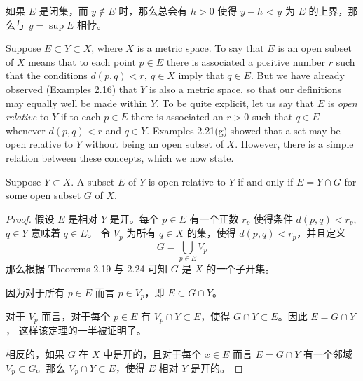 \documentclass[../poma-notes.tex]{subfiles}
\begin{document}
\anote 如果 $E$ 是闭集，而 $y \notin E$ 时，那么总会有 $h>0$ 使得 $y-h$ < $y$ 为 $E$ 的上界，那么与 $y = \sup E$ 相悖。

\begin{remark}
  Suppose $E \subset Y \subset X$, where $X$ is a metric space. To say that $E$ is an open subset of $X$ means that to
  each point $p \in E$ there is associated a positive number $r$ such that the conditions $d(p,q)<r,\ q \in X$ imply
  that $q \in E$. But we have already observed (Examples 2.16) that $Y$ is also a metric space, so that our definitions
  may equally well be made within $Y$. To be quite explicit, let us say that $E$ is \textit{open relative} to $Y$ if to
  each $p \in E$ there is associated an $r>0$ such that $q \in E$ whenever $d(p,q)<r$ and $q \in Y$. Examples 2.21(g)
  showed that a set may be open relative to $Y$ without being an open subset of $X$. However, there is a simple relation
  between these concepts, which we now state.
\end{remark}

\begin{theorem}
  Suppose $Y \subset X$. A subset $E$ of $Y$ is open relative to $Y$ if and only if $E = Y \cap G$ for some open
  subset $G$ of $X$.
\end{theorem}

\begin{proof}
  假设 $E$ 是相对 $Y$ 是开。每个 $p \in E$ 有一个正数 $r_p$ 使得条件 $d(p,q)<r_p$, $q \in Y$ 意味着 $q \in E$。
  令 $V_p$ 为所有 $q \in X$ 的集，使得 $d(p,q)<r_p$，并且定义
  \[G = \bigcup\limits_{p \in E} V_p\]
  那么根据 Theorems 2.19 与 2.24 可知 $G$ 是 $X$ 的一个子开集。

  因为对于所有 $p \in E$ 而言 $p \in V_p$，即 $E \subset G \cap Y$。

  对于 $V_p$ 而言，对于每个 $p \in E$ 有 $V_p \cap Y \subset E$，使得 $G \cap Y \subset E$。因此 $E = G \cap Y$，
  这样该定理的一半被证明了。

  相反的，如果 $G$ 在 $X$ 中是开的，且对于每个 $x \in E$ 而言 $E = G \cap Y$ 有一个邻域 $V_p \subset G$。那么
  $V_p \cap Y \subset E$，使得 $E$ 相对 $Y$ 是开的。
\end{proof}
\end{document}

